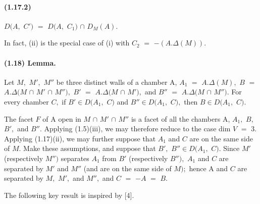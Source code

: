\documentclass[10pt,a4paper]{article}
\begin{document}
\paragraph{(1.17.2)} \ensuremath{D(A,} \ensuremath{C')} \ensuremath{=} \ensuremath{D(A,} \ensuremath{C_1)} \ensuremath{\cap{}} \ensuremath{D_M(A).}

In fact, (ii) is the special case of (i) with \ensuremath{C_2} \ensuremath{=} \ensuremath{-(A.\Delta{}(M)).}\par

\paragraph{(1.18) Lemma.} Let \ensuremath{M,} \ensuremath{M',} \ensuremath{M''} be three distinct walls of a chamber A, \ensuremath{A_1} \ensuremath{=} \ensuremath{A.\Delta{}(M),} \ensuremath{B} \ensuremath{=} \ensuremath{A.\Delta{}(M} \ensuremath{\cap{}} \ensuremath{M'} \ensuremath{\cap{}} \ensuremath{M''),} \ensuremath{B'} \ensuremath{=} \ensuremath{A.\Delta{}(M} \ensuremath{\cap{}} \ensuremath{M'),} and \ensuremath{B''} \ensuremath{=} \ensuremath{A.\Delta{}(M} \ensuremath{\cap{}} \ensuremath{M'').} For every chamber \ensuremath{C,} if \ensuremath{B'\in{}D(A_1,} \ensuremath{C)} and \ensuremath{B''\in{}D(A_1,} \ensuremath{C),} then \ensuremath{B\in{}D(A_1,} \ensuremath{C).}

The facet \ensuremath{F} of A open in \ensuremath{M} \ensuremath{\cap{}} \ensuremath{M'} \ensuremath{\cap{}} \ensuremath{M''} is a facet of all the chambers A, \ensuremath{A_1,} \ensuremath{B,} \ensuremath{B',} and \ensuremath{B''.} Applying (1.5)(iii), we may therefore reduce to the case dim \ensuremath{V} \ensuremath{=} 3. Applying (1.17)(ii), we may further suppose that \ensuremath{A_1} and \ensuremath{C} are on the same side of \ensuremath{M.} Make these assumptions, and suppose that \ensuremath{B',} \ensuremath{B''\in{}D(A_1,} \ensuremath{C).} Since \ensuremath{M'} (respectively \ensuremath{M'')} separates \ensuremath{A_1} from \ensuremath{B'} (respectively \ensuremath{B''),} \ensuremath{A_1} and \ensuremath{C} are separated by \ensuremath{M'} and \ensuremath{M''} (and are on the same side of \ensuremath{M);} hence A and \ensuremath{C} are separated by \ensuremath{M,} \ensuremath{M',} and \ensuremath{M'',} and \ensuremath{C} \ensuremath{=} \ensuremath{-A} \ensuremath{=} \ensuremath{B.}\par

The following key result is inspired by [4].\par
\end{document}
